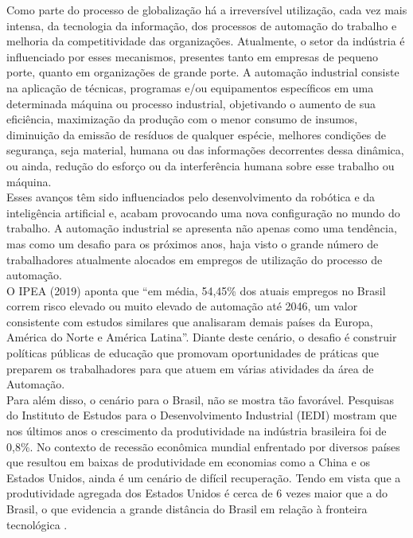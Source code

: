 Como parte do processo de globalização há a irreversível utilização, cada vez mais intensa, da tecnologia da informação, dos processos de automação do trabalho e melhoria da competitividade das organizações. Atualmente, o setor da indústria é influenciado por esses mecanismos, presentes tanto em empresas de pequeno porte, quanto em organizações de grande porte. A automação industrial  consiste na aplicação de técnicas, programas e/ou equipamentos específicos em uma determinada máquina ou processo industrial, objetivando o aumento de sua eficiência, maximização da produção com o menor consumo de insumos, diminuição da emissão de resíduos de qualquer espécie, melhores condições de segurança, seja material, humana ou das informações decorrentes dessa dinâmica, ou ainda, redução do esforço ou da interferência humana sobre esse trabalho ou máquina.\\

Esses avanços têm sido influenciados pelo desenvolvimento da robótica e da inteligência artificial e, acabam provocando uma nova configuração no mundo do trabalho. A automação industrial se apresenta não apenas como uma tendência, mas como um desafio para os próximos anos, haja visto o grande número de trabalhadores atualmente alocados em empregos de utilização do processo de automação.\\

O IPEA (2019) aponta que “em média, 54,45\% dos atuais empregos no Brasil correm risco elevado ou muito elevado de automação até 2046, um valor consistente com estudos similares que analisaram demais países da Europa, América do Norte e América Latina”. Diante deste cenário, o desafio é construir políticas públicas de educação que promovam oportunidades de práticas que preparem os trabalhadores para que atuem em várias atividades da área de Automação.\\

Para além disso, o cenário para o Brasil, não se mostra tão favorável. Pesquisas do Instituto de Estudos para o Desenvolvimento Industrial (IEDI) mostram que nos últimos anos o crescimento da produtividade na indústria brasileira foi de 0,8\%. No contexto de recessão econômica mundial enfrentado por diversos países que resultou em baixas de produtividade em economias como a China e os Estados Unidos, ainda é um cenário de difícil recuperação. Tendo em vista que a produtividade agregada dos Estados Unidos é cerca de 6 vezes maior que a do Brasil, o que evidencia a grande distância do Brasil em relação à fronteira tecnológica \cite{IEDI}.\\

